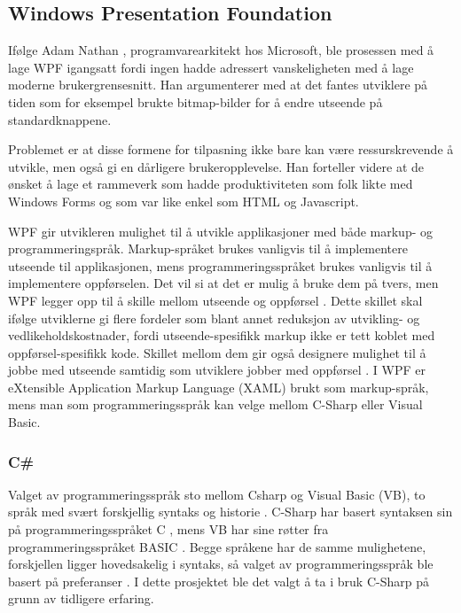  
\subsection{Windows Presentation Foundation} 
 
Ifølge Adam Nathan \cite[p.~9]{WPFbook}, programvarearkitekt hos Microsoft, ble prosessen med å lage WPF igangsatt fordi ingen hadde adressert vanskeligheten med å lage moderne brukergrensesnitt. Han argumenterer med at det fantes utviklere på tiden som for eksempel brukte bitmap-bilder for å endre utseende på standardknappene. 

Problemet er at disse formene for tilpasning ikke bare kan være ressurskrevende å utvikle, men også gi en dårligere brukeropplevelse. Han forteller videre at de ønsket å lage et rammeverk som hadde produktiviteten som folk likte med Windows Forms og som var like enkel som HTML og Javascript.

WPF gir utvikleren mulighet til å utvikle applikasjoner med både markup- og programmeringspråk. Markup-språket brukes vanligvis til å implementere utseende til applikasjonen, mens programmeringsspråket brukes vanligvis til å implementere oppførselen. Det vil si at det er mulig å bruke dem på tvers, men WPF legger opp til å skille mellom utseende og oppførsel \cite{Intro8:online}. Dette skillet skal ifølge utviklerne gi flere fordeler som blant annet reduksjon av utvikling- og vedlikeholdskostnader, fordi utseende-spesifikk markup ikke er tett koblet med oppførsel-spesifikk kode. Skillet mellom dem gir også designere mulighet til å jobbe med utseende samtidig som utviklere jobber med oppførsel \cite{Intro8:online}. I WPF er eXtensible Application Markup Language (XAML) brukt som markup-språk, mens man som programmeringsspråk kan velge mellom C-Sharp eller Visual Basic.

\subsubsection{C\#} 

Valget av programmeringsspråk sto mellom \gls{Csharp} og Visual Basic (\gls{VB}), to språk med svært forskjellig syntaks og historie \cite{Compa6:online}. C-Sharp har basert syntaksen sin på programmeringsspråket C , mens VB har sine røtter fra programmeringsspråket BASIC \cite{Visua3:online} \cite{About8:online}. Begge språkene har de samme mulighetene, forskjellen ligger hovedsakelig i syntaks, så valget av programmeringsspråk ble basert på preferanser \cite{What0:online}. I dette prosjektet ble det valgt å ta i bruk C-Sharp på grunn av tidligere erfaring.

